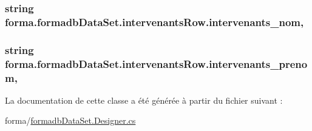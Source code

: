 \subsubsection[{\texorpdfstring{intervenants\+\_\+nom}{intervenants_nom}}]{\setlength{\rightskip}{0pt plus 5cm}string forma.\+formadb\+Data\+Set.\+intervenants\+Row.\+intervenants\+\_\+nom\hspace{0.3cm}{\ttfamily [get]}, {\ttfamily [set]}}\hypertarget{classforma_1_1formadb_data_set_1_1intervenants_row_a59554056d0eabe48f9cce7f8ea32a7de}{}\label{classforma_1_1formadb_data_set_1_1intervenants_row_a59554056d0eabe48f9cce7f8ea32a7de}
\subsubsection[{\texorpdfstring{intervenants\+\_\+prenom}{intervenants_prenom}}]{\setlength{\rightskip}{0pt plus 5cm}string forma.\+formadb\+Data\+Set.\+intervenants\+Row.\+intervenants\+\_\+prenom\hspace{0.3cm}{\ttfamily [get]}, {\ttfamily [set]}}\hypertarget{classforma_1_1formadb_data_set_1_1intervenants_row_aa85702e926a89873569245e92ebd3d28}{}\label{classforma_1_1formadb_data_set_1_1intervenants_row_aa85702e926a89873569245e92ebd3d28}


La documentation de cette classe a été générée à partir du fichier suivant \+:\begin{DoxyCompactItemize}
\item 
forma/\hyperlink{formadb_data_set_8_designer_8cs}{formadb\+Data\+Set.\+Designer.\+cs}\end{DoxyCompactItemize}

